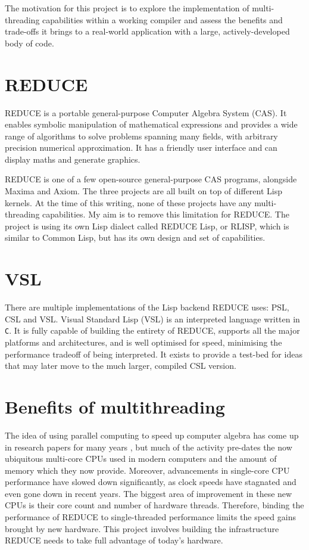The motivation for this project is to explore the implementation of multi-threading
capabilities within a working compiler and assess the benefits and trade-offs it brings
to a real-world application with a large, actively-developed body of code.

\section{REDUCE}

REDUCE \cite{reduce} is a portable general-purpose Computer Algebra System (CAS). It enables symbolic
manipulation of mathematical expressions and provides a wide range of algorithms
to solve problems spanning many fields, with arbitrary precision numerical approximation.
It has a friendly user interface and can display maths and generate graphics.

REDUCE is one of a few open-source general-purpose CAS programs, alongside Maxima and Axiom.
The three projects are all built on top of different Lisp kernels. At the time of this writing,
none of these projects have any multi-threading capabilities. My aim is to remove this limitation
for REDUCE. The project is using its own Lisp dialect called REDUCE Lisp, or RLISP,
which is similar to Common Lisp, but has its own design and set of capabilities.

\section{VSL}

There are multiple implementations of the Lisp backend REDUCE uses: PSL, CSL and VSL.
Visual Standard Lisp (VSL) is an interpreted language written
in \texttt{C}. It is fully capable of building the entirety of REDUCE, supports all the major
platforms and architectures, and is well optimised for speed, minimising the performance tradeoff
of being interpreted. It exists to provide a test-bed for ideas that may later move to the much larger,
compiled CSL version.

\section{Benefits of multithreading}
The idea of using parallel computing to speed up computer algebra has come
up in research papers for many years \cite{algebra-parallelism},
but much of the activity
pre-dates the now ubiquitous multi-core CPUs used in modern computers and the amount of memory
which they now provide. Moreover, advancements in single-core CPU performance have slowed down
significantly, as clock speeds have stagnated and even gone down in recent years. The biggest
area of improvement in these new CPUs is their core count and number of hardware threads.
Therefore, binding the performance of REDUCE to single-threaded performance limits the speed gains
brought by new hardware. This project involves building the infrastructure
REDUCE needs to take full advantage of today's hardware.

